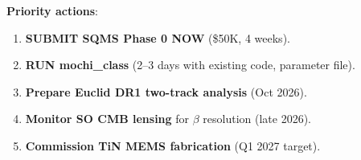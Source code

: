 \documentclass[11pt]{article}
\theoremstyle{remark}
\begin{document}
\textbf{Priority actions}:
\begin{enumerate}
\item \textbf{SUBMIT SQMS Phase 0 NOW} (\$50K, 4 weeks).
\item \textbf{RUN mochi\_class} (2--3 days with existing code, parameter file).
\item \textbf{Prepare Euclid DR1 two-track analysis} (Oct 2026).
\item \textbf{Monitor SO CMB lensing} for $\beta$ resolution (late 2026).
\item \textbf{Commission TiN MEMS fabrication} (Q1 2027 target).
\end{enumerate}
\end{document}
